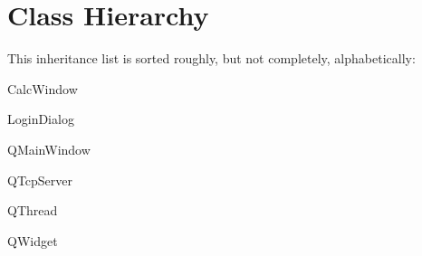\section{Class Hierarchy}
This inheritance list is sorted roughly, but not completely, alphabetically\+:\begin{DoxyCompactList}
\item Calc\+Window\begin{DoxyCompactList}
\item {}
\end{DoxyCompactList}
\item {}
\begin{DoxyCompactList}
\item {}
\end{DoxyCompactList}
\item Login\+Dialog\begin{DoxyCompactList}
\item {}
\end{DoxyCompactList}
\item Q\+Main\+Window\begin{DoxyCompactList}
\item {}
\end{DoxyCompactList}
\item Q\+Tcp\+Server\begin{DoxyCompactList}
\item {}
\end{DoxyCompactList}
\item Q\+Thread\begin{DoxyCompactList}
\item {}
\end{DoxyCompactList}
\item Q\+Widget\begin{DoxyCompactList}
\item {}
\item {}
\end{DoxyCompactList}
\end{DoxyCompactList}
